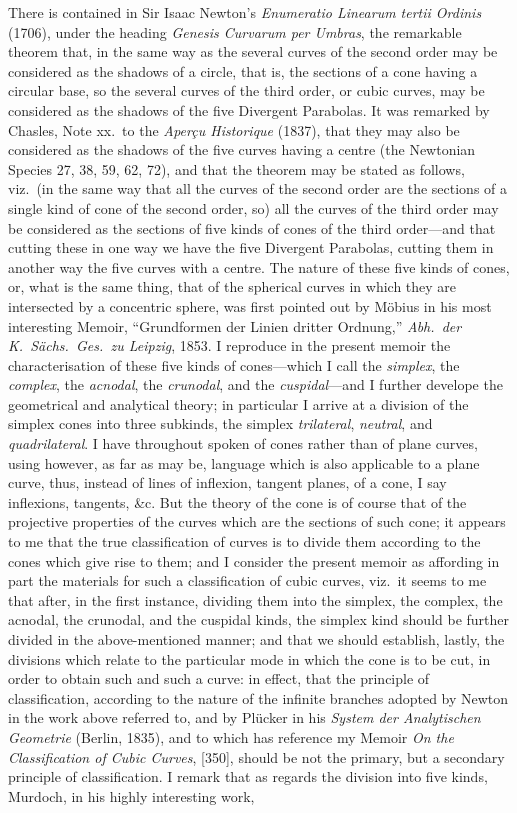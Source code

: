 \documentclass[11pt,a4paper]{article}
\begin{document}
There is contained in Sir Isaac Newton's \textit{Enumeratio Linearum tertii Ordinis} (1706), under the heading \textit{Genesis Curvarum per Umbras}, the remarkable theorem that, in the same way as the several curves of the second order may be considered as the shadows of a circle, that is, the sections of a cone having a circular base, so the several curves of the third order, or cubic curves, may be considered as the shadows of the five Divergent Parabolas. It was remarked by Chasles, Note xx.\ to the \textit{Aper\c{c}u Historique} (1837), that they may also be considered as the shadows of the five curves having a centre (the Newtonian Species 27, 38, 59, 62, 72), and that the theorem may be stated as follows, viz.\ (in the same way that all the curves of the second order are the sections of a single kind of cone of the second order, so) all the curves of the third order may be considered as the sections of five kinds of cones of the third order---and that cutting these in one way we have the five Divergent Parabolas, cutting them in another way the five curves with a centre. The nature of these five kinds of cones, or, what is the same thing, that of the spherical curves in which they are intersected by a concentric sphere, was first pointed out by M\"obius in his most interesting Memoir, ``Grundformen der Linien dritter Ordnung,'' \textit{Abh.\ der K.\ S\"achs.\ Ges.\ zu Leipzig}, 1853. I reproduce in the present memoir the characterisation of these five kinds of cones---which I call the \textit{simplex}, the \textit{complex}, the \textit{acnodal}, the \textit{crunodal}, and the \textit{cuspidal}---and I further develope the geometrical and analytical theory; in particular I arrive at a division of the simplex cones into three subkinds, the simplex \textit{trilateral}, \textit{neutral}, and \textit{quadrilateral}. I have throughout spoken of cones rather than of plane curves, using however, as far as may be, language which is also applicable to a plane curve, thus, instead of lines of inflexion, tangent planes, of a cone, I say inflexions, tangents, \&c. But the theory of the cone is of course that of the projective properties of the curves which are the sections of such cone; it appears to me that the true classification of curves is to divide them according to the cones which give rise to them; and I consider the present memoir as affording in part the materials for such a classification of cubic curves, viz.\ it seems to me that after, in the first instance, dividing them into the simplex, the complex, the acnodal, the crunodal, and the cuspidal kinds, the simplex kind should be further divided in the above-mentioned manner; and that we should establish, lastly, the divisions which relate to the particular mode in which the cone is to be cut, in order to obtain such and such a curve: in effect, that the principle of classification, according to the nature of the infinite branches adopted by Newton in the work above referred to, and by Pl\"ucker in his \textit{System der Analytischen Geometrie} (Berlin, 1835), and to which has reference my Memoir \textit{On the Classification of Cubic Curves}, [350], should be not the primary, but a secondary principle of classification. I remark that as regards the division into five kinds, Murdoch, in his highly interesting work, 
\end{document}
